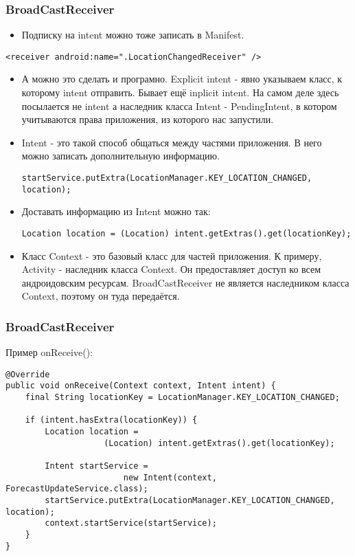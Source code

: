\documentclass[utf8]{beamer}
\begin{document}
\begin{frame}[fragile]
    \frametitle{BroadCastReceiver}
    \begin{itemize}    
 	    \item Подписку на intent можно тоже записать в Manifest.
 	\end{itemize}
    \begin{lstlisting}
<receiver android:name=".LocationChangedReceiver" />
    \end{lstlisting}		    
\end{frame}
\begin{frame}[fragile]
    \begin{itemize}
        \item А можно это сделать и програмно. Explicit intent - явно указываем класс, к которому intent отправить. Бывает ещё inplicit intent. На самом деле здесь посылается не intent а наследник класса Intent - PendingIntent, в котором учитываются права приложения, из которого нас запустили. 
        \item Intent - это такой способ общаться между частями приложения. В него можно записать дополнительную информацию.
        \begin{lstlisting}
startService.putExtra(LocationManager.KEY_LOCATION_CHANGED, location);
        \end{lstlisting}        
        \item Доставать информацию из Intent можно так:
        \begin{lstlisting}
Location location = (Location) intent.getExtras().get(locationKey);
        \end{lstlisting}
        \item Класс Context - это базовый класс для частей приложения. К примеру, Activity - наследник класса Context. Он предоставляет доступ ко всем андроидовским ресурсам. BroadCastReceiver не является наследником класса Context, поэтому он туда передаётся.
    \end{itemize}
\end{frame}
\begin{frame}[fragile]
    \frametitle{BroadCastReceiver}
    Пример onReceive():
    \begin{lstlisting}[basicstyle=\tiny]
@Override
public void onReceive(Context context, Intent intent) {
    final String locationKey = LocationManager.KEY_LOCATION_CHANGED;

    if (intent.hasExtra(locationKey)) {
        Location location = 
                    (Location) intent.getExtras().get(locationKey);

        Intent startService = 
                        new Intent(context, ForecastUpdateService.class);
        startService.putExtra(LocationManager.KEY_LOCATION_CHANGED, location);
        context.startService(startService);
    }
} 
    \end{lstlisting}
\end{frame}
\end{document}
